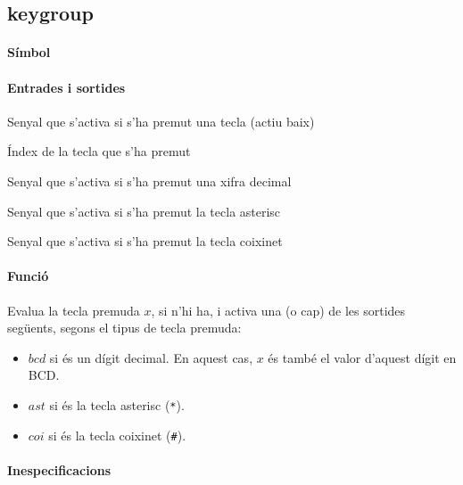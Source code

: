 \subsection{\label{sub:\projectname-keygroup} \textsf{keygroup}}

\paragraph{Símbol}

\begin{center}  \end{center}

\paragraph{Entrades i sortides}

\begin{where}
\item[\nodenamebit{nkey}] Senyal que s'activa si s'ha premut una tecla (actiu baix)
\item[\nodenamerange{x}{3}{0}] Índex de la tecla que s'ha premut
\item[\nodenamebit{bcd}] Senyal que s'activa si s'ha premut una xifra decimal
\item[\nodenamebit{ast}] Senyal que s'activa si s'ha premut la tecla asterisc
\item[\nodenamebit{coi}] Senyal que s'activa si s'ha premut la tecla coixinet
\end{where}

\paragraph{Funció}

Evalua la tecla premuda $x$, si n'hi ha, i activa una (o cap) de les sortides següents,
segons el tipus de tecla premuda:

\begin{itemize}
\item $bcd$ si és un dígit decimal. En aquest cas, $x$ és també
el valor d'aquest dígit en BCD.
\item $ast$ si és la tecla asterisc (\texttt{*}).
\item $coi$ si és la tecla coixinet (\texttt{\#}).
\end{itemize}

\paragraph{Inespecificacions}


